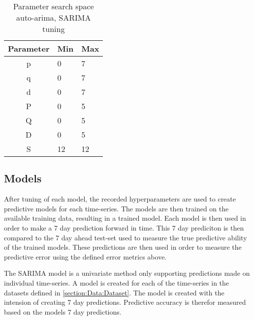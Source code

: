 \begin{table}[h]
  \centering
  \caption{Parameter search space auto-arima, SARIMA tuning}
  \label{table:method:arima-tuning}
  \begin{tabular}{|c|l|l|}\hline
    Parameter & Min & Max \\ \hline
    p         & 0   & 7   \\ \hline
    q         & 0   & 7   \\ \hline
    d         & 0   & 7   \\ \hline
    P         & 0   & 5   \\ \hline
    Q         & 0   & 5   \\ \hline
    D         & 0   & 5   \\ \hline
    S         & 12   & 12   \\ \hline
  \end{tabular}
\end{table}


\subsection{Models}

After tuning of each model, the recorded hyperparameters are used to create predictive models for each time-series.
The models are then trained on the available training data, resulting in a trained model.
Each model is then used in order to make a 7 day prediction forward in time.
This 7 day prediciton is then compared to the 7 day ahead test-set used to measure the true predictive ability of the trained models.
These predictions are then used in order to measure the predictive error using the defined error metrics above.



\fi



\iffalse
  The SARIMA model is a univariate method only supporting predictions made on individual time-series.
  A model is created for each of the time-series in the datasets defined in \cref{section:Data:Dataset}.
  The model is created with the intension of creating 7 day predictions.
  Predictive accuracy is therefor measured based on the models 7 day predictions.

